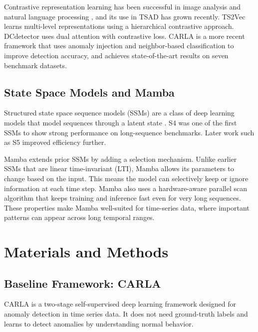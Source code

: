 \documentclass{svproc}
\begin{document}
Contrastive representation learning has been successful in image analysis \cite{chen2020simple} and natural language processing \cite{logeswaran2018efficient}, and its use in TSAD has grown recently. TS2Vec \cite{yue2022ts2vec} learns multi-level representations using a hierarchical contrastive approach. DCdetector \cite{yang2023dcdetector} uses dual attention with contrastive loss. CARLA \cite{darban2024carla} is a more recent framework that uses anomaly injection and neighbor-based classification to improve detection accuracy, and achieves state-of-the-art results on seven benchmark datasets.

\subsection{State Space Models and Mamba}

Structured state space sequence models (SSMs) are a class of deep learning models that model sequences through a latent state \cite{gu2022efficiently}. S4 \cite{gu2022efficiently} was one of the first SSMs to show strong performance on long-sequence benchmarks. Later work such as S5 \cite{smith2023simplified} improved efficiency further.

Mamba \cite{gu2023mamba} extends prior SSMs by adding a selection mechanism. Unlike earlier SSMs that are linear time-invariant (LTI), Mamba allows its parameters to change based on the input. This means the model can selectively keep or ignore information at each time step. Mamba also uses a hardware-aware parallel scan algorithm that keeps training and inference fast even for very long sequences. These properties make Mamba well-suited for time-series data, where important patterns can appear across long temporal ranges.

\section{Materials and Methods}

\subsection{Baseline Framework: CARLA}

CARLA \cite{darban2024carla} is a two-stage self-supervised deep learning framework designed for anomaly detection in time series data. It does not need ground-truth labels and learns to detect anomalies by understanding normal behavior.
\end{document}
